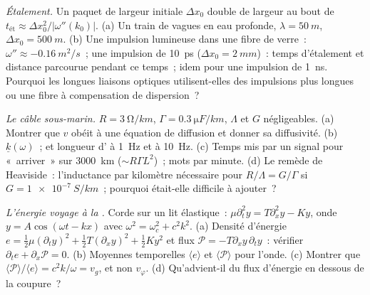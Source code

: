 \begin{exercise}[$\star\star$]\label{exo:b2:dispersion-wave-packets:8}
\emph{Étalement.} Un paquet de largeur initiale $\Delta x_0$ double de largeur
au bout de $t_{\text{ét}} \approx \Delta x_0^2/|\omega''(k_0)|$. (a) Un train de vagues en eau
profonde, $\lambda = \qty{50}{m}$, $\Delta x_0 = \qty{500}{m}$. (b) Une impulsion lumineuse dans
une fibre de verre~: $\omega'' \approx \qty{-0.16}{m^2/s}$~; une impulsion de \qty{10}{ps} ($\Delta x_0 =
\qty{2}{mm}$)~: temps d'étalement et distance parcourue pendant ce temps~; idem
pour une impulsion de \qty{1}{ns}. Pourquoi les longues liaisons optiques utilisent-elles des impulsions plus longues ou
une fibre à compensation de dispersion~?
\end{exercise}

\begin{exercise}[$\star\star$]\label{exo:b2:dispersion-wave-packets:9}
\emph{Le câble sous-marin.} $R = \qty{3}{\ohm/km}$, $\Gamma = \qty{0.3}{\micro F/km}$,
$\Lambda$ et $G$ négligeables. (a) Montrer que $v$ obéit à une équation de diffusion et
donner sa diffusivité. (b)  $\underline k(\omega)$~;  et longueur d' à \qty{1}{Hz} et à \qty{10}{Hz}. (c)
Temps mis par un signal pour «~arriver~» sur \qty{3000}{km} ($\sim R\Gamma L^2$)~; mots par
minute. (d) Le remède de Heaviside~: l'inductance par kilomètre nécessaire pour
$R/\Lambda = G/\Gamma$ si $G = \qty{1e-7}{S/km}$~; pourquoi était-elle difficile à ajouter~?
\end{exercise}

\begin{exercise}[$\star\star\star$]\label{exo:b2:dispersion-wave-packets:10}
\emph{L'énergie voyage à la .} Corde sur un lit élastique~:
$\mu\partial_t^2y = T\partial_x^2y - Ky$, onde $y = A\cos(\omega t - kx)$ avec $\omega^2 =
\omega_c^2 + c^2k^2$. (a) Densité d'énergie $e = \tfrac12\mu(\partial_ty)^2 + \tfrac12T
(\partial_xy)^2 + \tfrac12Ky^2$ et flux $\mathcal P = -T\partial_xy\,\partial_ty$~: vérifier
$\partial_te + \partial_x\mathcal P = 0$. (b) Moyennes temporelles $\langle e\rangle$ et
$\langle\mathcal P\rangle$ pour l'onde. (c) Montrer que $\langle\mathcal P\rangle/
\langle e\rangle = c^2k/\omega = v_g$, et non $v_\varphi$. (d) Qu'advient-il du
flux d'énergie en dessous de la coupure~?
\end{exercise}

